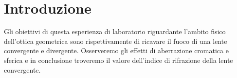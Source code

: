 \section{Introduzione}

Gli obiettivi di questa esperienza di laboratorio riguardante l'ambito fisico dell'ottica geometrica sono rispettivamente di ricavare il fuoco di una lente convergente e divergente. Osserveremo gli effetti di aberrazione cromatica e sferica e in conclusione troveremo il valore dell'indice di rifrazione della lente convergente. 

